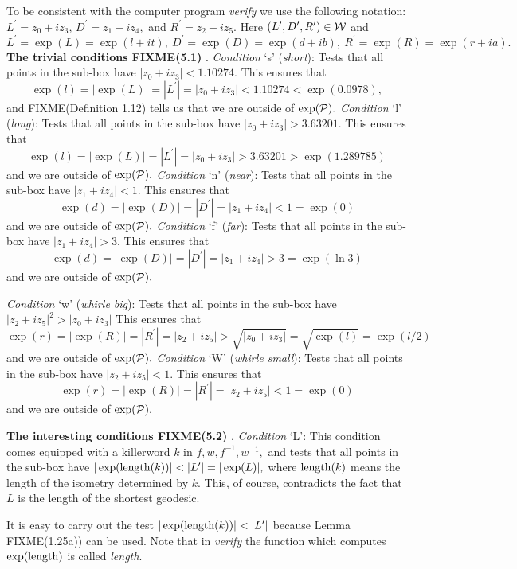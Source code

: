 To be consistent with the computer program {\it verify} we use the following notation: $L^{\prime} = z_0 + i z_3$,
$D^{\prime} = z_1 + i z_4,$ and $R^{\prime} = z_2 + i z_5.$  Here $(L^{\prime}, D^{\prime}, R^{\prime}) \in {\cal W}$ and
$L^{\prime} = \exp(L) = \exp(l+it),\   D^{\prime} = \exp(D) = \exp(d+ib),\  
R^{\prime} = \exp(R) = \exp(r+ia).$
 {{\bf The trivial conditions  
FIXME(5.1)
}}.
{\it Condition} `s' ({\it short}):  Tests that all points in the sub-box have $|z_0 + i z_3| < 1.10274.$  This ensures that  
$$\exp(l) = |\exp(L)| = |L^{\prime}| = |z_0 + i z_3| < 1.10274 < \exp(0.0978),$$  and
FIXME(Definition 1.12)
 tells us that we are
outside of $\exp({\cal P}).$
{\it Condition} `l' ({\it long}): Tests that all points in the sub-box have $|z_0 + i z_3| > 3.63201.$  This ensures that  
$$\exp(l) = |\exp(L)| = |L^{\prime}| = |z_0 + i z_3| > 3.63201 > \exp(1.289785)$$ and we are outside of $\exp({\cal P}).$  
\vglue6pt
{\it Condition} `n' ({\it near}): Tests that all points in the sub-box have $|z_1 + i z_4| < 1.$  This ensures that 
$$\exp(d) = |\exp(D)| = |D^{\prime}| = |z_1 + i z_4| <1= \exp(0)$$ and we are outside of $\exp({\cal P}).$
\vglue6pt
{\it Condition} `f' ({\it far}): Tests that all points in the sub-box have $|z_1 + i z_4| > 3.$  This ensures that 
$$\exp(d) = |\exp(D)| = |D^{\prime}| = |z_1 + i z_4|  > 3= \exp(\ln 3)$$ and we are outside of $\exp({\cal P}).$  
\eject

{\it Condition} `w' ({\it whirle  big}): Tests that all points in the sub-box have $|z_2 + i z_5|^2 > |z_0 + i z_3| $  This
ensures that $$\exp(r) = |\exp(R)| = |R^{\prime}| = |z_2 + i z_5|  > \sqrt{|z_0 + i z_3|} =  \sqrt {\exp(l)} = \exp(l/2)$$ and
we are outside of $\exp({\cal P}).$  
{\it Condition} `W' ({\it whirle  small}): Tests that all points in the sub-box have $|z_2 + i z_5| < 1. $  This ensures that
$$\exp(r) = |\exp(R)| = |R^{\prime}| = |z_2 + i z_5|  < 1 = \exp(0)$$ and we are outside of $\exp({\cal P}).$

 {{\bf The interesting conditions 
FIXME(5.2)
}}.
{\it Condition}  `L': This condition comes equipped with a killerword $k$ in $f, w, f^{-1}, w^{-1},$ and tests that all
points in the sub-box have $|\exp({\rm length}(k))| <  |L^{\prime}| = |\exp(L)|,$ where ${\rm length}(k)$ means the length
of the isometry determined by $k.$   This, of course, contradicts the fact that $L$ is the length of the shortest geodesic.

It is easy to carry out the test $|\exp({\rm length}(k))| <  |L^{\prime}|$ because
Lemma FIXME(1.25a)) can be used.
Note that in {\it verify} the function which computes $\exp({\rm length})$ is called {\it length}.  

